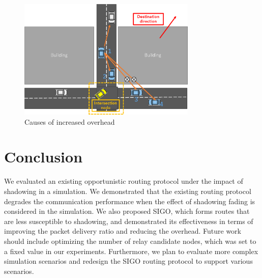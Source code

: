 \documentclass[conference]{IEEEtran}
\begin{document}
\begin{figure}[!ht]
\centering
\includegraphics[width=85mm]{figures/overhead_reason.eps}
\caption{Causes of increased overhead}
\label{fig:overhead_reason}
\end{figure}



\section{Conclusion}
\label{conclusion}
We evaluated an existing opportunistic routing protocol under the impact of shadowing in a simulation. We demonstrated that the existing routing protocol degrades the communication performance when the effect of shadowing fading is considered in the simulation. 
We also proposed SIGO, which forms routes that are less susceptible to shadowing, and demonstrated its effectiveness in terms of improving the packet delivery ratio and reducing the overhead. 
Future work should include optimizing the number of relay candidate nodes, which was set to a fixed value in  our experiments. Furthermore, we plan to evaluate more complex simulation scenarios and redesign the SIGO routing protocol to support  various scenarios.





\end{document}
